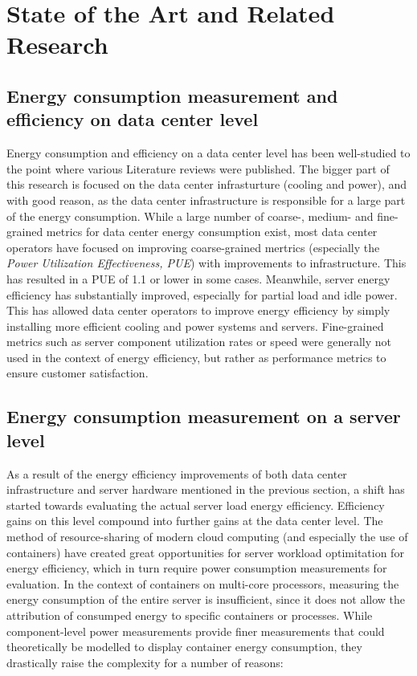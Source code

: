 \chapter{State of the Art and Related Research} %
\label{Chapter2}

\section{Energy consumption measurement and efficiency on data center level}

Energy consumption and efficiency on a data center level has been well-studied to the point where various Literature reviews were published\parencite{long2022review, jin2020review}. The bigger part of this research is focused on the data center infrasturture (cooling and power), and with good reason, as the data center infrastructure is responsible for a large part of the energy consumption. While a large number of coarse-, medium- and fine-grained metrics for data center energy consumption exist, most data center operators have focused on improving coarse-grained mertrics (especially the \textit{Power Utilization Effectiveness, PUE}) with improvements to infrastructure. This has resulted in a PUE of 1.1 or lower in some cases\parencite{uptime2023pue}. Meanwhile, server energy efficiency has substantially improved, especially for partial load and idle power\parencite{tropgen202416}. This has allowed data center operators to improve energy efficiency by simply installing more efficient cooling and power systems and servers. Fine-grained metrics such as server component utilization rates or speed were generally not used in the context of energy efficiency, but rather as performance metrics to ensure customer satisfaction.

\section{Energy consumption measurement on a server level}

As a result of the energy efficiency improvements of both data center infrastructure and server hardware mentioned in the previous section, a shift has started towards evaluating the actual server load energy efficiency. Efficiency gains on this level compound into further gains at the data center level. The method of resource-sharing of modern cloud computing (and especially the use of containers) have created great opportunities for server workload optimitation for energy efficiency, which in turn require power consumption measurements for evaluation. In the context of containers on multi-core processors, measuring the energy consumption of the entire server is insufficient, since it does not allow the attribution of consumped energy to specific containers or processes. While component-level power measurements provide finer measurements that could theoretically be modelled to display container energy consumption, they drastically raise the complexity for a number of reasons:

